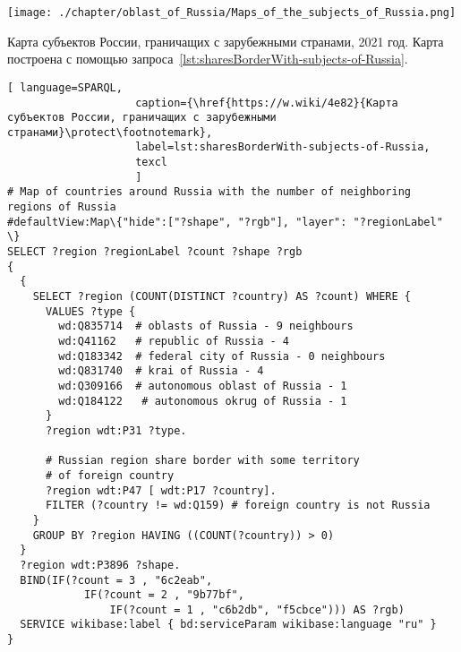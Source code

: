 \begin{marginfigure}
	\texttt{[image: ./chapter/oblast\_of\_Russia/Maps\_of\_the\_subjects\_of\_Russia.png]}
	\caption[Карта пограничных субъектов России, 2021 год.]{Карта субъектов России, граничащих с зарубежными странами, 2021 год. Карта построена с помощью запроса~\protect\ref{lst:sharesBorderWith-subjects-of-Russia}.}%
      \label{fig:MapsharesBorderWithsubjectsofRussia}%
\end{marginfigure}

\lstset{numbers=left, firstnumber=1, frame=single}
\begin{lstlisting}[ language=SPARQL, 
                    caption={\href{https://w.wiki/4e82}{Карта субъектов России, граничащих с зарубежными странами}\protect\footnotemark},
                    label=lst:sharesBorderWith-subjects-of-Russia,
                    texcl 
                    ]
# Map of countries around Russia with the number of neighboring regions of Russia
#defaultView:Map\{"hide":["?shape", "?rgb"], "layer": "?regionLabel" \}
SELECT ?region ?regionLabel ?count ?shape ?rgb
{
  {
    SELECT ?region (COUNT(DISTINCT ?country) AS ?count) WHERE {
      VALUES ?type {
        wd:Q835714  # oblasts of Russia - 9 neighbours
        wd:Q41162   # republic of Russia - 4
        wd:Q183342  # federal city of Russia - 0 neighbours
        wd:Q831740  # krai of Russia - 4
        wd:Q309166  # autonomous oblast of Russia - 1
        wd:Q184122   # autonomous okrug of Russia - 1
      }
      ?region wdt:P31 ?type.
  
      # Russian region share border with some territory 
      # of foreign country
      ?region wdt:P47 [ wdt:P17 ?country].
      FILTER (?country != wd:Q159) # foreign country is not Russia
    }
    GROUP BY ?region HAVING ((COUNT(?country)) > 0)
  }
  ?region wdt:P3896 ?shape.
  BIND(IF(?count = 3 , "6c2eab", 
            IF(?count = 2 , "9b77bf", 
                IF(?count = 1 , "c6b2db", "f5cbce"))) AS ?rgb)
  SERVICE wikibase:label { bd:serviceParam wikibase:language "ru" }  
}
\end{lstlisting}%




